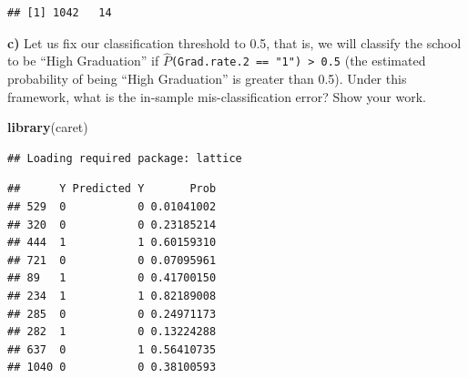 \documentclass[]{article}
\newenvironment{Shaded}{\begin{snugshade}}{\end{snugshade}}
\newcommand{\KeywordTok}[1]{\textcolor[rgb]{0.13,0.29,0.53}{\textbf{#1}}}
\newcommand{\DecValTok}[1]{\textcolor[rgb]{0.00,0.00,0.81}{#1}}
\newcommand{\StringTok}[1]{\textcolor[rgb]{0.31,0.60,0.02}{#1}}
\newcommand{\CommentTok}[1]{\textcolor[rgb]{0.56,0.35,0.01}{\textit{#1}}}
\newcommand{\OperatorTok}[1]{\textcolor[rgb]{0.81,0.36,0.00}{\textbf{#1}}}
\newcommand{\NormalTok}[1]{#1}
\begin{document}
\begin{verbatim}
## [1] 1042   14
\end{verbatim}

\textbf{c)} Let us fix our classification threshold to 0.5, that is, we
will classify the school to be ``High Graduation'' if
\(\hat{P}\)\texttt{(Grad.rate.2\ ==\ "1")\ \textgreater{}\ 0.5} (the
estimated probability of being ``High Graduation'' is greater than 0.5).
Under this framework, what is the in-sample mis-classification error?
Show your work.

\begin{Shaded}
\begin{Highlighting}[]
\KeywordTok{library}\NormalTok{(caret)}
\end{Highlighting}
\end{Shaded}

\begin{verbatim}
## Loading required package: lattice
\end{verbatim}

\begin{Shaded}
\end{Shaded}

\begin{verbatim}
##      Y Predicted Y       Prob
## 529  0           0 0.01041002
## 320  0           0 0.23185214
## 444  1           1 0.60159310
## 721  0           0 0.07095961
## 89   1           0 0.41700150
## 234  1           1 0.82189008
## 285  0           0 0.24971173
## 282  1           0 0.13224288
## 637  0           1 0.56410735
## 1040 0           0 0.38100593
\end{verbatim}
\end{document}
